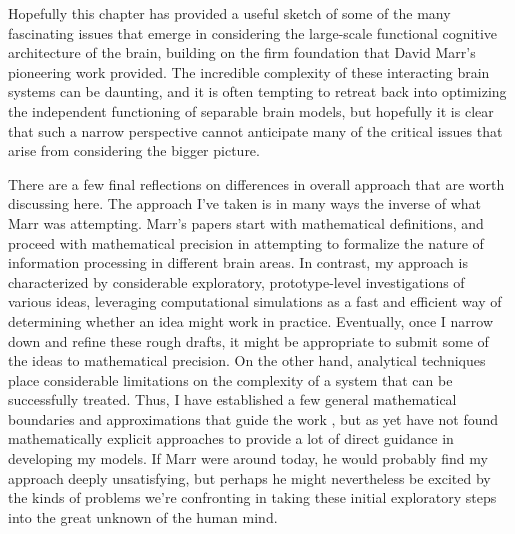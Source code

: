 \documentclass[11pt,twoside]{article}
\newif\myifpdf
\begin{document}
Hopefully this chapter has provided a useful sketch of some of the many fascinating issues that emerge in considering the large-scale functional cognitive architecture of the brain, building on the firm foundation that David Marr's pioneering work provided.  The incredible complexity of these interacting brain systems can be daunting, and it is often tempting to retreat back into optimizing the independent functioning of separable brain models, but hopefully it is clear that such a narrow perspective cannot anticipate many of the critical issues that arise from considering the bigger picture.

There are a few final reflections on differences in overall approach that are worth discussing here.  The approach I've taken is in many ways the inverse of what Marr was attempting.  Marr's papers start with mathematical definitions, and proceed with mathematical precision in attempting to formalize the nature of information processing in different brain areas.  In contrast, my approach is characterized by considerable exploratory, prototype-level investigations of various ideas, leveraging computational simulations as a fast and efficient way of determining whether an idea might work in practice.  Eventually, once I narrow down and refine these rough drafts, it might be appropriate to submit some of the ideas to mathematical precision.  On the other hand, analytical techniques place considerable limitations on the complexity of a system that can be successfully treated.  Thus, I have established a few general mathematical boundaries and approximations that guide the work \cite[e.g.,]{OReilly96}, but as yet have not found mathematically explicit approaches to provide a lot of direct guidance in developing my models.  If Marr were around today, he would probably find my approach deeply unsatisfying, but perhaps he might nevertheless be excited by the kinds of problems we're confronting in taking these initial exploratory steps into the great unknown of the human mind.

\clearpage

\end{document}
